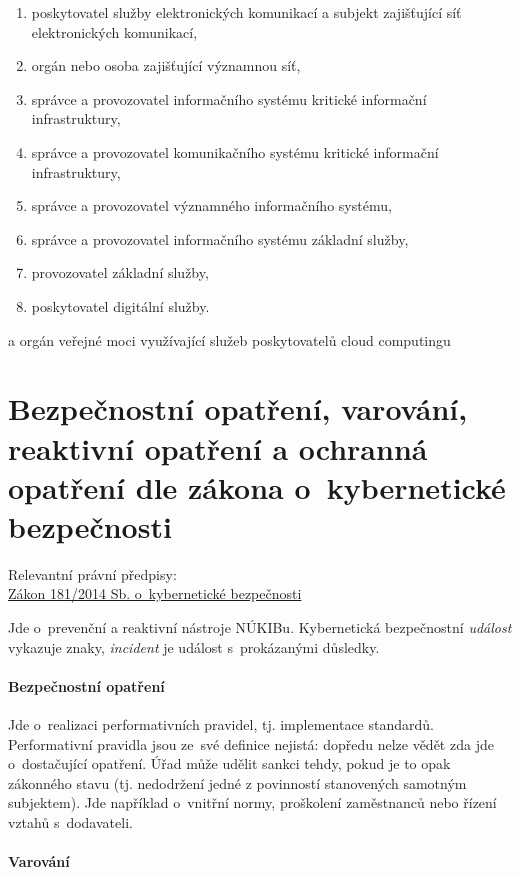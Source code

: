 \begin{enumerate}[label=\alph*)]
\item poskytovatel služby elektronických komunikací a subjekt zajišťující síť elektronických komunikací,
\item orgán nebo osoba zajišťující významnou síť,
\item správce a provozovatel informačního systému kritické informační infrastruktury,
\item správce a provozovatel komunikačního systému kritické informační infrastruktury,
\item správce a provozovatel významného informačního systému,
\item správce a provozovatel informačního systému základní služby,
\item provozovatel základní služby,
\item poskytovatel digitální služby.
\end{enumerate}

a orgán veřejné moci využívající služeb poskytovatelů cloud computingu


\clearpage
\section{Bezpečnostní opatření, varování, reaktivní opatření a ochranná opatření dle zákona o~kybernetické bezpečnosti}

{}Relevantní právní předpisy:
\\\href{https://www.zakonyprolidi.cz/cs/2014-181}{Zákon 181/2014 Sb. o~kybernetické bezpečnosti}

Jde o~prevenční a reaktivní nástroje NÚKIBu.
Kybernetická bezpečnostní \emph{událost} vykazuje znaky, \emph{incident} je událost s~prokázanými důsledky.

\paragraph{Bezpečnostní opatření}

Jde o~realizaci performativních pravidel, tj. implementace standardů.
Performativní pravidla jsou ze~své definice nejistá: dopředu nelze vědět zda jde o~dostačující opatření.
Úřad může udělit sankci tehdy, pokud je to opak zákonného stavu (tj. nedodržení jedné z povinností stanovených samotným subjektem).
Jde například o~vnitřní normy, proškolení zaměstnanců nebo řízení vztahů s~dodavateli.

\paragraph{Varování}

